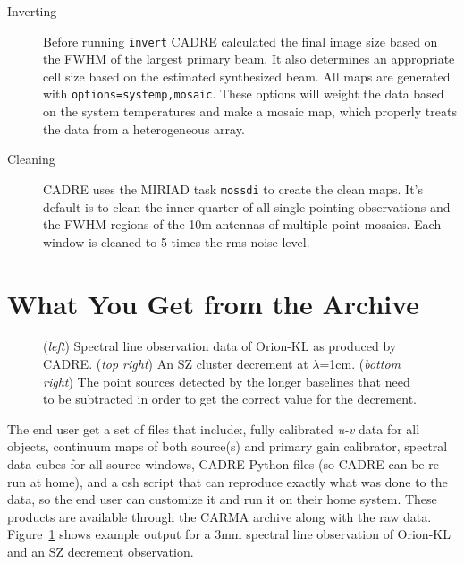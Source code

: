 \begin{description}
\begin{description}
\item[Inverting] Before running \verb#invert# CADRE calculated the final image size based on the FWHM of the largest primary beam. It also determines an appropriate cell size based on the estimated synthesized beam. All maps are generated with \verb#options=systemp,mosaic#. These options will weight the data based on the system temperatures and make a mosaic map, which properly treats the data from a heterogeneous array.
\item[Cleaning] CADRE uses the MIRIAD task \verb#mossdi# to create the clean maps. It's default is to clean the inner quarter of all single pointing observations and the FWHM regions of the 10m antennas of multiple point mosaics. Each window is cleaned to 5 times the rms noise level.
\end{description}
\end{description}

\section{What You Get from the Archive}
\begin{figure}[!ht]
\end{figure}
\begin{figure}[!ht]
\caption{(\textit{left}) Spectral line observation data of Orion-KL as produced by CADRE. (\textit{top right}) An SZ cluster decrement at $\lambda$=1cm. (\textit{bottom right}) The point sources detected by the longer baselines that need to be subtracted in order to get the correct value for the decrement.\label{fig:SZD}}
\end{figure}
\begin{figure}[!ht]
\end{figure}
The end user get a set of files that include:, fully calibrated \textit{u-v} data for all objects, continuum maps of both source(s) and primary gain calibrator, spectral data cubes for all source windows,  CADRE Python files (so CADRE can be re-run at home), and a csh script that can reproduce exactly what was done to the data, so the end user can customize it and run it on their home system. These products are available through the CARMA archive along with the raw data. Figure~\ref{fig:SZD} shows example output for a 3mm spectral line observation of Orion-KL and an SZ decrement observation.

